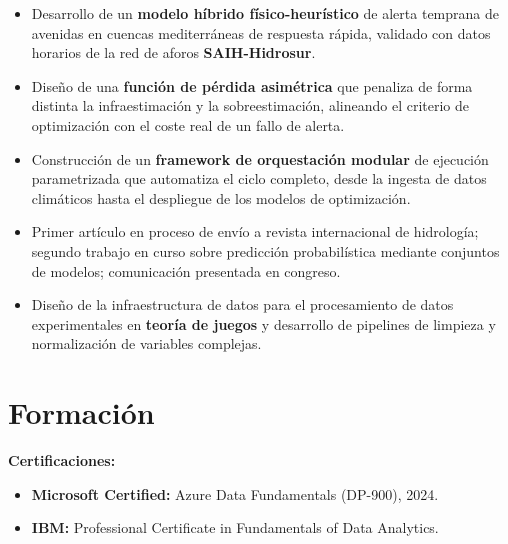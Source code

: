 \documentclass[10pt]{article}
\begin{document}
\begin{itemize}
    \item Desarrollo de un \textbf{modelo híbrido físico-heurístico} de alerta temprana de avenidas en cuencas mediterráneas de respuesta rápida, validado con datos horarios de la red de aforos \textbf{SAIH-Hidrosur}.
    \item Diseño de una \textbf{función de pérdida asimétrica} que penaliza de forma distinta la infraestimación y la sobreestimación, alineando el criterio de optimización con el coste real de un fallo de alerta.
    \item Construcción de un \textbf{framework de orquestación modular} de ejecución parametrizada que automatiza el ciclo completo, desde la ingesta de datos climáticos hasta el despliegue de los modelos de optimización.
    \item Primer artículo en proceso de envío a revista internacional de hidrología; segundo trabajo en curso sobre predicción probabilística mediante conjuntos de modelos; comunicación presentada en congreso.
\end{itemize}

\begin{itemize}
    \item Diseño de la infraestructura de datos para el procesamiento de datos experimentales en \textbf{teoría de juegos} y desarrollo de pipelines de limpieza y normalización de variables complejas.
\end{itemize}

\section{Formación}





\vspace*{0.3cm}
\textbf{Certificaciones:}
\begin{itemize}
    \item \textbf{Microsoft Certified:} Azure Data Fundamentals (DP-900), 2024.
    \item \textbf{IBM:} Professional Certificate in Fundamentals of Data Analytics.
\end{itemize}
\end{document}
